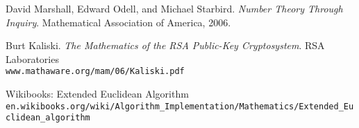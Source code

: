\documentclass[a4paper]{article}
\begin{document}
\begin{thebibliography}{9}
David Marshall, Edward Odell, and Michael Starbird. 
\textit{Number Theory Through Inquiry}. 
Mathematical Association of America, 2006.
 
Burt Kaliski.
\textit{The Mathematics of the RSA Public-Key Cryptosystem}.
RSA Laboratories
~\\
\texttt{www.mathaware.org/mam/06/Kaliski.pdf}
 
Wikibooks: Extended Euclidean Algorithm
~\\
\texttt{en.wikibooks.org/wiki/Algorithm\_Implementation/Mathematics/Extended\_Euclidean\_algorithm}
\end{thebibliography}
\end{document}
